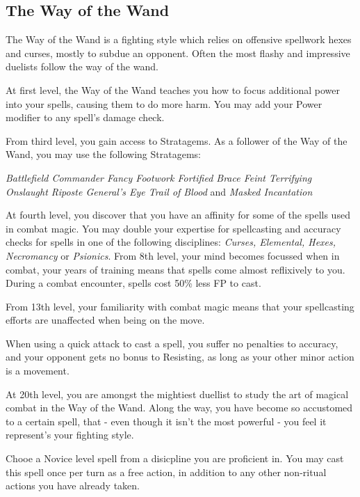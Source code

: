 {\newpage
\subsection{\bf The Way of the Wand}

The Way of the Wand is a fighting style which relies on offensive spellwork \minus{} hexes and curses, mostly  \minus{} to subdue an opponent. Often the most flashy and impressive duelists follow the way of the wand. 

{
	At first level, the Way of the Wand teaches you how to focus additional power into your spells, causing them to do more harm. You may add your Power modifier to any spell's damage check.   
}



From third level, you gain access to Stratagems. As a follower of the Way of the Wand, you may use the following Stratagems:

{\it
Battlefield Commander\comma{} Fancy Footwork\comma{} Fortified Brace\comma{} Feint\comma{} Terrifying Onslaught\comma{} Riposte\comma{} General’s Eye\comma{} Trail of Blood } and {\it Masked Incantation
}

{
	At fourth level, you discover that you have an affinity for some of the spells used in combat magic.  You may double your expertise for spellcasting and accuracy checks for spells in one of the following disciplines: {\it  Curses, Elemental, Hexes, Necromancy} or {\it Psionics}. 
}
{
	From 8th level, your mind becomes focussed when in combat, your years of training means that spells come almost reflixively to you. 
	During a combat encounter, spells cost 50\% less FP to cast. 
}
{
	From 13th level, your familiarity with combat magic means that your spellcasting efforts are unaffected when being on the move. 
	
	When using a quick attack to cast a spell, you suffer no penalties to accuracy, and your opponent gets no bonus to Resisting, as long as your other minor action is a movement. 
}
{
At 20th level, you are amongst the mightiest duellist to study the art of magical combat in the Way of the Wand. Along the way, you have become so accustomed to a certain spell, that - even though it isn't the most powerful - you feel it represent's your fighting style.  

Chooe a Novice level spell from a disicpline you are proficient in. You may cast this spell once per turn as a free action, in addition to any other non-ritual actions you have already taken.
}

}
